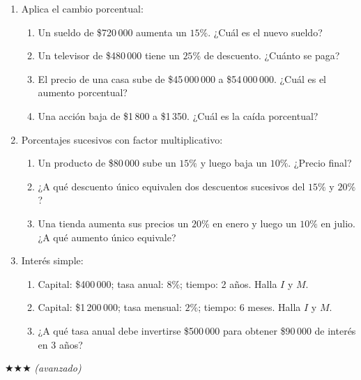 \documentclass[11pt, letterpaper]{article}
\begin{document}
\begin{enumerate}[label=\textbf{\arabic*.}, leftmargin=*, resume]

\item Aplica el cambio porcentual:
\begin{enumerate}[label=\alph*)]
  \item Un sueldo de \$720\,000 aumenta un $15\%$. ¿Cu\'al es el nuevo sueldo?
  \item Un televisor de \$480\,000 tiene un $25\%$ de descuento. ¿Cu\'anto se paga?
  \item El precio de una casa sube de \$45\,000\,000 a \$54\,000\,000. ¿Cu\'al es el aumento porcentual?
  \item Una acci\'on baja de \$1\,800 a \$1\,350. ¿Cu\'al es la ca\'ida porcentual?
\end{enumerate}

\item Porcentajes sucesivos con factor multiplicativo:
\begin{enumerate}[label=\alph*)]
  \item Un producto de \$80\,000 sube un $15\%$ y luego baja un $10\%$. ¿Precio final?
  \item ¿A qu\'e descuento \'unico equivalen dos descuentos sucesivos del $15\%$ y $20\%$?
  \item Una tienda aumenta sus precios un $20\%$ en enero y luego un $10\%$ en julio. ¿A qu\'e aumento \'unico equivale?
\end{enumerate}

\item Inter\'es simple:
\begin{enumerate}[label=\alph*)]
  \item Capital: \$400\,000; tasa anual: $8\%$; tiempo: 2 a\~nos. Halla $I$ y $M$.
  \item Capital: \$1\,200\,000; tasa mensual: $2\%$; tiempo: 6 meses. Halla $I$ y $M$.
  \item ¿A qu\'e tasa anual debe invertirse \$500\,000 para obtener \$90\,000 de inter\'es en 3 a\~nos?
\end{enumerate}

\end{enumerate}

$\bigstar\bigstar\bigstar$ \textit{(avanzado)}
\end{document}
